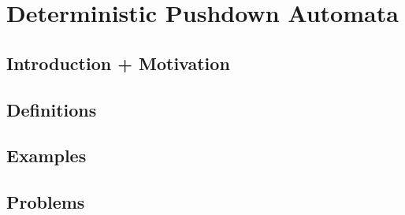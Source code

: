 \chapter{Deterministic Pushdown Automata}

\section{Introduction + Motivation}

\section{Definitions}

\section{Examples}

\section{Problems}